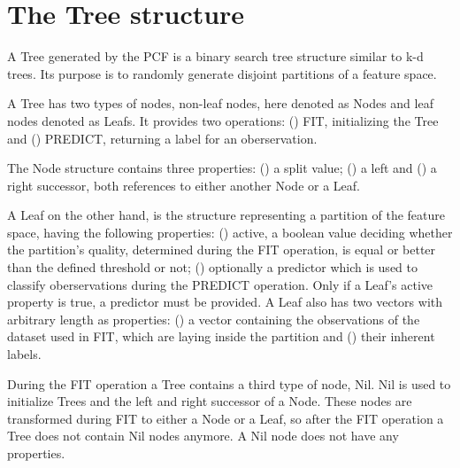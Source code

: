 \section{The Tree structure}

A Tree generated by the PCF is a binary search tree
structure similar to k-d trees. Its purpose is to randomly
generate disjoint partitions of a feature space.

A Tree has two types of nodes, non-leaf nodes, here denoted
as Nodes and leaf nodes denoted as Leafs. It provides two
operations: () FIT, initializing the Tree
and () PREDICT, returning a label for an
oberservation.

The Node structure contains three properties:
() a split value; () a left
and () a right successor, both references to
either another Node or a Leaf.

A Leaf on the other hand, is the structure
representing a partition of the feature space, having the
following properties: () active, a boolean
value deciding whether the partition's quality, determined
during the FIT operation, is equal or better than the
defined threshold or not; () optionally a
predictor which is used to classify oberservations during
the PREDICT operation. Only if a Leaf's active property is
true, a predictor must be provided. A Leaf also has two
vectors with arbitrary length as properties:
() a vector containing the observations of
the dataset used in FIT, which are laying inside the
partition and () their inherent labels.

During the FIT operation a Tree contains a third type of
node, Nil. Nil is used to initialize Trees
and the left and right successor of a Node. These nodes are
transformed during FIT to either a Node or a Leaf, so after
the FIT operation a Tree does not contain Nil nodes
anymore. A Nil node does not have any properties.




